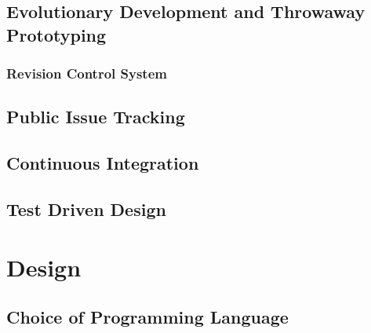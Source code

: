 \documentclass[12pt, a4paper]{article}
\begin{document}
\subsection{Evolutionary Development and Throwaway Prototyping}


\subsubsection{Revision Control System}


\subsection{Public Issue Tracking}


\subsection{Continuous Integration}


\subsection{Test Driven Design}


\section{Design}


\subsection{Choice of Programming Language}


\end{document}
